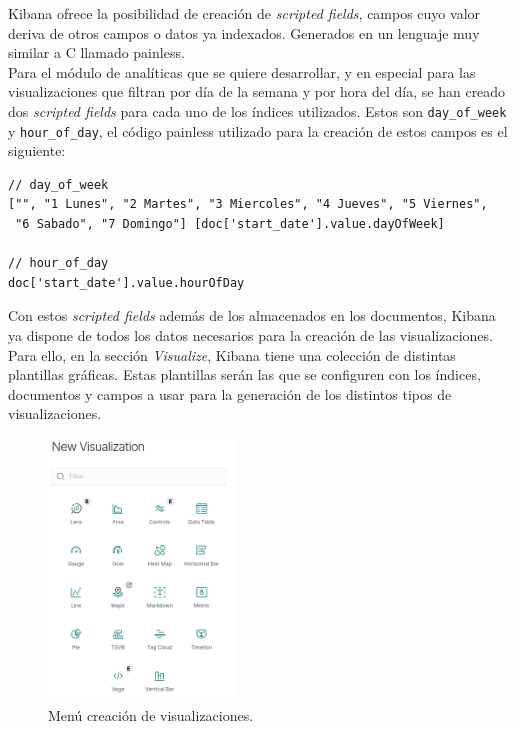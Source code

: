 \documentclass[11pt,a4paper]{book}
\begin{document}
				Kibana ofrece la posibilidad de creación de \textit{scripted fields}, campos cuyo valor deriva de otros campos o datos ya indexados. Generados en un lenguaje muy similar a C llamado painless. \\
								
				Para el módulo de analíticas que se quiere desarrollar, y en especial para las visualizaciones que filtran por día de la semana y por hora del día, se han creado dos \textit{scripted fields} para cada uno de los índices utilizados. Estos son \texttt{day\_of\_week} y \texttt{hour\_of\_day}, el código painless utilizado para la creación de estos campos es el siguiente:
				
				\begin{Verbatim}[tabsize=4]	
// day_of_week
["", "1 Lunes", "2 Martes", "3 Miercoles", "4 Jueves", "5 Viernes",
 "6 Sabado", "7 Domingo"] [doc['start_date'].value.dayOfWeek]

// hour_of_day
doc['start_date'].value.hourOfDay
				\end{Verbatim}
				
				Con estos \textit{scripted fields} además de los almacenados en los documentos, Kibana ya dispone de todos los datos necesarios para la creación de las visualizaciones. Para ello, en la sección \textit{Visualize}, Kibana tiene una colección de distintas plantillas gráficas. Estas plantillas serán las que se configuren con los índices, documentos y campos a usar para la generación de los distintos tipos de visualizaciones.
				
				\begin{figure}[H]
					\centering
					\includegraphics[width=5cm, keepaspectratio]{img/visualization_selector.png}
					\caption{Menú creación de visualizaciones.}
					\label{fig:visualization_selector}
				\end{figure}
			
\end{document}
